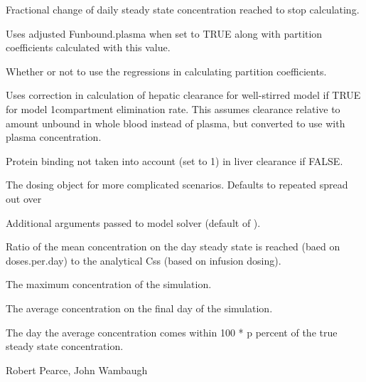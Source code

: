 \documentclass[a4paper]{book}
\begin{document}
\begin{Arguments}
\begin{ldescription}
\item[\code{f.change}] Fractional change of daily steady state concentration
reached to stop calculating.

\item[\code{adjusted.Funbound.plasma}] Uses adjusted Funbound.plasma when set to
TRUE along with partition coefficients calculated with this value.

\item[\code{regression}] Whether or not to use the regressions in calculating
partition coefficients.

\item[\code{well.stirred.correction}] Uses correction in calculation of hepatic
clearance for well-stirred model if TRUE for model 1compartment elimination
rate.  This assumes clearance relative to amount unbound in whole blood
instead of plasma, but converted to use with plasma concentration.

\item[\code{restrictive.clearance}] Protein binding not taken into account (set to
1) in liver clearance if FALSE.

\item[\code{dosing}] The dosing object for more complicated scenarios. Defaults to
repeated  spread out over 

\item[\code{...}] Additional arguments passed to model solver (default of
).
\end{ldescription}
\end{Arguments}
%
\begin{Value}
\begin{ldescription}
\item[\code{frac}] Ratio of the mean concentration on the day steady state
is reached (baed on doses.per.day) to the analytical Css (based on infusion
dosing).\item[\code{max}] The maximum concentration of the simulation.
\item[\code{avg}] The average concentration on the final day of the simulation.
\item[\code{the.day}] The day the average concentration comes within 100 * p
percent of the true steady state concentration.
\end{ldescription}
\end{Value}
%
\begin{Author}\relax
Robert Pearce, John Wambaugh
\end{Author}
\end{document}
